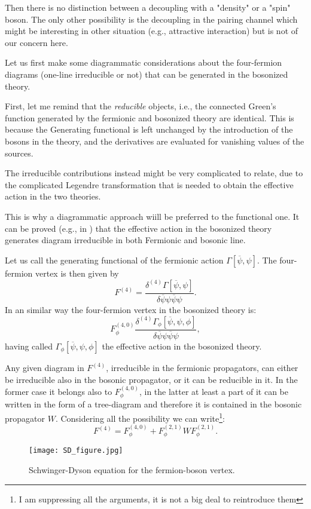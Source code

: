 \documentclass[a4paper,11pt]{article}
\begin{document}
Then there is no distinction between a decoupling with a "density" or a "spin" boson. 
The only other possibility is the decoupling in the pairing channel which might be interesting in other situation (e.g., attractive interaction) but is not of our concern here.

Let us first make some diagrammatic considerations about the four-fermion diagrams (one-line irreducible or not) that can be generated in the bosonized theory.

First, let me remind that the {\sl reducible} objects, i.e., the connected Green's function generated by the fermionic and bosonized theory are identical. 
This is because the Generating functional \cite{Negele1998} is left unchanged by the introduction of the bosons in the theory, and the derivatives are evaluated for vanishing values of the sources. 

The irreducible contributions instead might be very complicated to relate, due to the complicated Legendre transformation that is needed to obtain the effective action in the two theories. 

This is why a diagrammatic approach wiill be preferred to the functional one. 
It can be proved (e.g., in \cite{Schuetz2004}) that the effective action in the bosonized theory generates diagram irreducible in both Fermionic and bosonic line. 

Let us call the generating functional of the fermionic action $\Gamma[\overline \psi, \psi]$. 
The four-fermion vertex is then given by 
\begin{equation}
F^{(4)}=\frac{\delta ^{(4)} \Gamma[\overline\psi, \psi]}{\delta\overline \psi \psi\overline \psi \psi }.
\end{equation} 
In an similar way the four-fermion vertex in the bosonized theory is: 
\begin{equation}
F_\phi^{(4,0)}\frac{\delta ^{(4)} \Gamma_\phi[\overline\psi, \psi,\phi]}{\delta\overline \psi \psi\overline \psi \psi },
\end{equation} 
having called  $\Gamma_\phi[\overline\psi,\psi,\phi]$ the effective action in the bosonized theory. 

Any given diagram in $F^{(4)}$, irreducible in the fermionic propagators, can either be irreducible also in the bosonic propagator, or it can be reducible in it. In the former case it belongs also to $F^{(4,0)}_\phi$, in the latter at least a part of it can be written in the form of a tree-diagram and therefore it is contained in the bosonic propagator $W$. 
Considering all the possibility we can write\footnote{I am suppressing all the arguments, it is not a big deal to reintroduce them}: 
\begin{equation}
\label{connection_without_SD}
F^{(4)}=F^{(4,0)}_\phi+F_\phi^{(2,1)} W F_\phi^{(2,1)}.
\end{equation}  
\begin{figure}
\texttt{[image: SD\_figure.jpg]}
\label{SD_figure}
\caption{Schwinger-Dyson equation for the fermion-boson vertex. } 
\end{figure}
\end{document}
